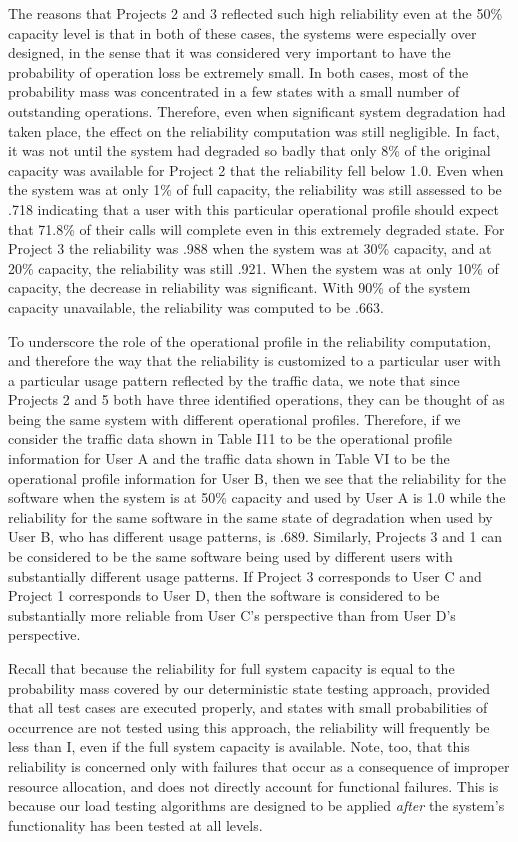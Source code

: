 \documentclass[journal, twoside]{IEEEtran}
\begin{document}
The reasons that Projects 2 and 3 reflected such high reliability even at the 50\% capacity level is that in both of these
cases, the systems were especially over designed, in the sense
that it was considered very important to have the probability of
operation loss be extremely small. In both cases, most of the
probability mass was concentrated in a few states with a small
number of outstanding operations. Therefore, even when significant system degradation had taken place, the effect on the
reliability computation was still negligible. In fact, it was not
until the system had degraded so badly that only 8\% of the
original capacity was available for Project 2 that the reliability
fell below 1.0. Even when the system was at only 1\% of full
capacity, the reliability was still assessed to be .718 indicating
that a user with this particular operational profile should expect that 71.8\% of their calls will complete even in this extremely degraded state. For Project 3 the reliability was .988
when the system was at 30\% capacity, and at 20\% capacity,
the reliability was still .921. When the system was at only 10\%
of capacity, the decrease in reliability was significant. With
90\% of the system capacity unavailable, the reliability was
computed to be .663. 

To underscore the role of the operational profile in the reliability computation, and therefore the way that the reliability is
customized to a particular user with a particular usage pattern
reflected by the traffic data, we note that since Projects 2 and 5
both have three identified operations, they can be thought of as
being the same system with different operational profiles.
Therefore, if we consider the traffic data shown in Table I11 to
be the operational profile information for User A and the traffic data shown in Table VI to be the operational profile information for User B, then we see that the reliability for the software when the system is at 50\% capacity and used by User A
is 1.0 while the reliability for the same software in the same
state of degradation when used by User B, who has different
usage patterns, is .689. Similarly, Projects 3 and 1 can be considered to be the same software being used by different users
with substantially different usage patterns. If Project 3 corresponds to User C and Project 1 corresponds to User D, then
the software is considered to be substantially more reliable
from User C’s perspective than from User D’s perspective.

Recall that because the reliability for full system capacity is
equal to the probability mass covered by our deterministic
state testing approach, provided that all test cases are executed
properly, and states with small probabilities of occurrence are not tested using this approach, the reliability will frequently be
less than I, even if the full system capacity is available. Note,
too, that this reliability is concerned only with failures that
occur as a consequence of improper resource allocation, and
does not directly account for functional failures. This is because our load testing algorithms are designed to be applied \textit{after} the system’s functionality has been tested at all levels.
\end{document}

